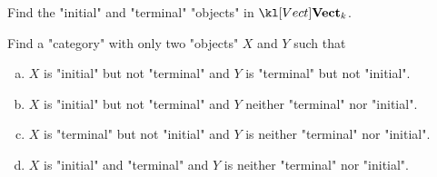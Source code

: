 \documentclass[main.tex]{subfiles}
\begin{document}
\begin{exer}\label{exer:duality:zeroinvect}
	Find the "initial" and "terminal" "objects" in $\catVect{k}$.
\end{exer}
\begin{exer}\label{exer:duality:terminalinitial}
	Find a "category" with only two "objects" $X$ and $Y$ such that
	\begin{enumerate}[(a)]
		\item $X$ is "initial" but not "terminal" and $Y$ is "terminal" but not "initial".
		\item $X$ is "initial" but not "terminal" and $Y$ neither "terminal" nor "initial".
		\item $X$ is "terminal" but not "initial" and $Y$ is neither "terminal" nor "initial".
		\item $X$ is "initial" and "terminal" and $Y$ is neither "terminal" nor "initial".
	\end{enumerate} 
\end{exer}
\end{document}
